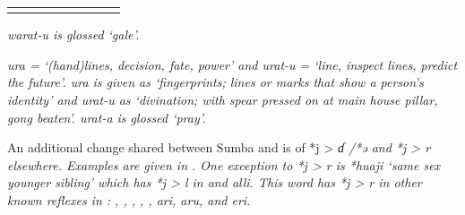 \begin{table}
\begin{threeparttable}
\begin{tabular}{lll@{ }ll@{ }lll@{ }l}
		\lspbottomrule
	\end{tabular}
		\begin{tablenotes}\tnsize
			\item[†]	{ \it{warat-u} is glossed ‘gale’.}
			\item[‡]	{ \it{ura} = ‘(hand)lines,
								decision, fate, power’
								and \it{urat-u} = ‘line, inspect lines, predict the future’.
								 \it{ura} is given as ‘fingerprints; lines or marks that
								show a person’s identity’
								and \it{urat-u} as ‘divination; with spear pressed on at main
								house pillar, gong beaten’.
								 \it{urat-a} is glossed ‘pray’.}
		\end{tablenotes}
	\end{threeparttable}
\end{table}

\clearpage
An additional change shared between Sumba
and  is of *j > \it{ɗ} /*ə{\gap}
and *j > \it{r} elsewhere.
Examples are given in .
One exception to *j > \it{r} is *huaji ‘same sex younger sibling’
which has *j > \it{l} in  and  \it{alli}.
This word has *j > \it{r} in other known reflexes in :
, , , , ,
 \it{ari},  \it{aru},
and  \it{eri}.

